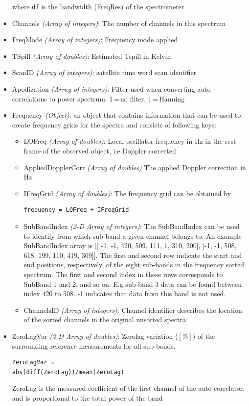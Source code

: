 \begin{itemize}
                         where {\tt df} is the bandwidth (FreqRes) of the spectrometer
  \item Channels \emph{(Array of integers)}: The number of channels in this spectrum
  \item FreqMode \emph{(Array of integers)}: Frequency mode applied
  \item TSpill \emph{(Array of doubles)}: Estimated Tspill in Kelvin
  \item ScanID \emph{(Array of integers)}: satellite time word scan identifier
  \item Apodization \emph{(Array of integers)}: Filter used when converting
    auto-correlations to power spectrum. 1\,=\,no filter, 1\,=\,Hanning 
  \item Frequency \emph{(Object)}: an object that contains information that can be used to create frequency grids for the spectra
                       and consists of following keys: 
  \begin{itemize}             
      \item LOFreq \emph{(Array of doubles)}: Local oscillator frequency in Hz in the rest frame of the
                       observed object, i.e Doppler corrected
      \item AppliedDopplerCorr \emph{(Array of doubles)} The applied Doppler correction in Hz
      \item IFreqGrid \emph{(Array of doubles)}: The frequency grid can be obtained by
                       \begin{verbatim}frequency = LOFreq + IFreqGrid\end{verbatim}
      \item SubBandIndex \emph{(2-D Array of integers)}: The SubBandIndex 
                       can be used to identify from which sub-band a given channel belongs to.
                       An example SubBandIndex array is [[ -1, -1, 420, 509, 111, 1, 310, 200],
                       [-1, -1, 508, 618, 199, 110, 419, 309]].
                       The first and second row indicate the start and end positions, respectively,
                       of the eight sub-bands in the frequency sorted spectrum.
                       The first and second index in these rows corresponds to SubBand 1 and 2, and so
                       on. E.g sub-band 3 data can be found between index 420 to 508.
                       -1 indicates that data from this band is not used.
     \item ChannelsID \emph{(Array of integers)}: Channel identifier describes the location
                       of the sorted channels in the original unsorted spectra
  \end{itemize} 
  \item ZeroLagVar \emph{(2-D Array of doubles)}: Zerolag variation (\([\%]\)) of the surrounding reference measurements for all sub-bands.
                       \begin{verbatim}ZeroLagVar =
abs(diff(ZeroLag))/mean(ZeroLag)\end{verbatim} 
                        ZeroLag is the measured coefficient of the first channel of the auto-correlator,
                        and is proportional to the total power of the band
\end{itemize}
